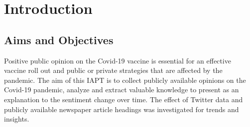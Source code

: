 \chapter{Introduction}


%




\section{Aims and Objectives}

Positive public opinion on the Covid-19 vaccine is essential for an effective vaccine roll out and public or private strategies that are affected by the pandemic.
The aim of this \ac{IAPT} is to collect publicly available opinions on the Covid-19 pandemic, analyze and extract valuable knowledge to present as an explanation to the sentiment change over time.
The effect of Twitter data and publicly available newspaper article headings was investigated for trends and insights.

